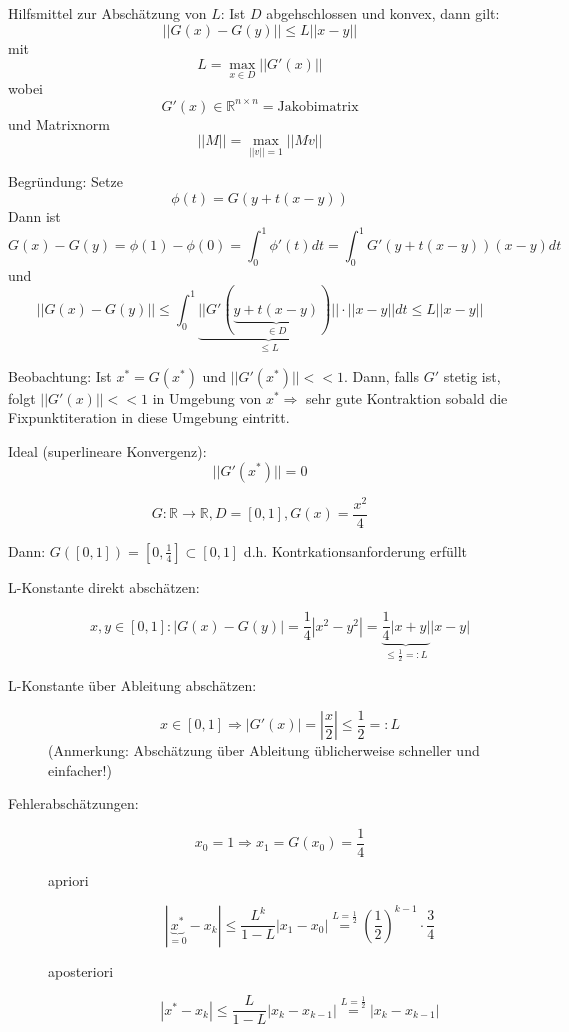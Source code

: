 \documentclass[10pt,a4paper]{article}
\begin{document}
Hilfsmittel zur Abschätzung von $L$:
Ist $D$ abgehschlossen und konvex, dann gilt: $$||G(x)-G(y)|| \leq L ||x-y||$$ mit $$L= \max\limits_{x \in D}  ||G'(x)||$$ wobei $$G'(x) \in \mathbb{R}^{n \times n} = \text{Jakobimatrix}$$ und Matrixnorm $$||M||=\max\limits_{||v||=1}||Mv||$$


Begründung: Setze $$\phi(t)=G(y+t(x-y))$$ Dann ist $$G(x)-G(y)=\phi(1)-\phi(0) = \int_{0}^{1} \phi'(t)dt = \int_{0}^{1}G'(y+t(x-y))(x-y)dt$$ und $$||G(x)-G(y)|| \leq \int_{0}^{1} \underbrace{||G'(\underbrace{y+t(x-y)}_{\in D})||}_{\leq L} \cdot ||x-y|| dt \leq L ||x-y||$$

Beobachtung: Ist $x^{*}=G(x^{*})$ und $||G'(x^{*})||<<1$. Dann, falls $G'$ stetig ist, folgt $||G'(x)||<<1$ in Umgebung von $x^{*} \Rightarrow$ sehr gute Kontraktion sobald die Fixpunktiteration in diese Umgebung eintritt.

Ideal (superlineare Konvergenz): $$||G'(x^{*})||=0$$


\begin{bsp}[Lipschitzkonstante und Fehler von $G(x)=\frac{x^{2}}{4}$]
$$G:\mathbb{R} \rightarrow \mathbb{R}, D=[0,1], G(x)=\frac{x^{2}}{4}$$

Dann: $G([0,1])=[0,\frac{1}{4}]\subset [0,1]$ d.h. Kontrkationsanforderung erfüllt

\begin{description}

\item[L-Konstante direkt abschätzen:] $$x,y \in [0,1]: |G(x)-G(y)|=\frac{1}{4}|x^{2}-y^{2}|=\underbrace{\frac{1}{4}|x+y|}_{\leq \frac{1}{2}=:L}|x-y|$$

\item[L-Konstante über Ableitung abschätzen:] $$x \in [0,1] \Rightarrow |G'(x)|=\left| \frac{x}{2} \right| \leq \frac{1}{2} =: L$$ (Anmerkung: Abschätzung über Ableitung üblicherweise schneller und einfacher!)

\item[Fehlerabschätzungen:] $$x_0=1 \Rightarrow x_1=G(x_0)=\frac{1}{4}$$

\begin{description}
\item[apriori] $$|\underbrace{x^{*}}_{=0}-x_k| \leq \frac{L^{k}}{1-L}|x_1-x_0| \stackrel{L=\frac{1}{2}}{=} \left( \frac{1}{2}\right)^{k-1} \cdot \frac{3}{4}$$
\item[aposteriori] $$|x^{*}-x_k| \leq \frac{L}{1-L}|x_k-x_{k-1}|\stackrel{L=\frac{1}{2}}{=}|x_k-x_{k-1}|$$
\end{description}

\end{description}

\end{bsp}
\end{document}
